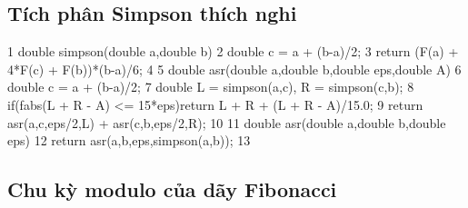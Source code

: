 \documentclass[11pt]{article}
\begin{document}
\subsection{Tích phân Simpson thích nghi}

\begin{Code}
 1   double simpson(double a,double b){
 2       double c = a + (b-a)/2;
 3       return (F(a) + 4*F(c) + F(b))*(b-a)/6;
 4   }
 5   double asr(double a,double b,double eps,double A){
 6       double c = a + (b-a)/2;
 7       double L = simpson(a,c), R = simpson(c,b);
 8       if(fabs(L + R - A) <= 15*eps)return L + R + (L + R - A)/15.0;
 9       return asr(a,c,eps/2,L) + asr(c,b,eps/2,R);
10   }
11   double asr(double a,double b,double eps){
12       return asr(a,b,eps,simpson(a,b));
13   }
\end{Code}

\subsection{Chu kỳ modulo của dãy Fibonacci}
\end{document}

